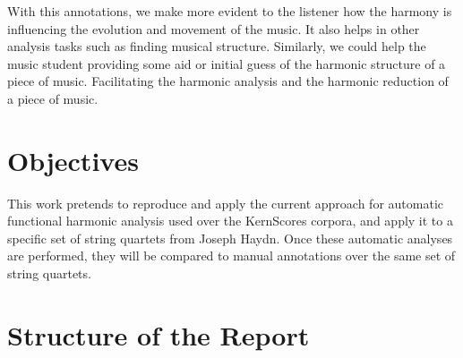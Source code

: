 With this annotations, we make more evident to the listener how the harmony is influencing the evolution and movement of the music. It also helps in other analysis tasks such as finding musical structure. Similarly, we could help the music student providing some aid or initial guess of the harmonic structure of a piece of music. Facilitating the harmonic analysis and the harmonic reduction of a piece of music.

\section{Objectives}
This work pretends to reproduce and apply the current approach for automatic functional harmonic analysis used over the KernScores corpora, and apply it to a specific set of string quartets from Joseph Haydn. Once these automatic analyses are performed, they will be compared to manual annotations over the same set of string quartets.

\section{Structure of the Report}


\newpage


